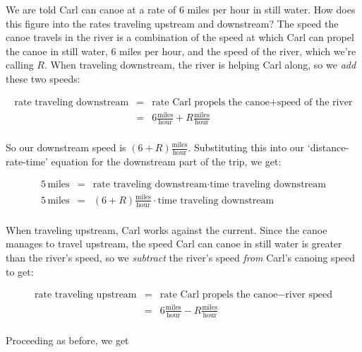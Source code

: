 \begin{ex}
We are told Carl can canoe at a  rate of $6$ miles per hour in still water.  How does this figure into the rates traveling upstream and downstream?  The speed the canoe travels in the river is a combination of the speed at which Carl can propel the canoe in still water, 6 miles per hour,  and the speed of the river, which we're calling $R$. When traveling downstream, the river is helping Carl along, so we \textit{add} these two speeds: 

\[ \begin{array}{rcl}

\text{rate traveling downstream} & = & \text{rate Carl propels the canoe} + \text{speed of the river} \\

 & = & 6 \frac{\text{miles}}{\text{hour}} + R \frac{\text{miles}}{\text{hour}} \\ \end{array} \]
 
 So our downstream speed is $(6+R) \frac{\text{miles}}{\text{hour}}$.  Substituting this into our `distance-rate-time' equation for the downstream part of the trip, we get:
 
 \[ \begin{array}{rcl}

5 \, \text{miles} & = & \text{rate traveling downstream} \cdot \text{time traveling downstream} \\ 

5 \, \text{miles} & = & (6+R) \frac{\text{miles}}{\text{hour}} \cdot \text{time traveling downstream} \\ 	\end{array} \]

 When traveling upstream, Carl works against the current.  Since the canoe manages to travel upstream,  the speed Carl can canoe in still water is greater than the river's speed, so we \textit{subtract} the river's speed \textit{from} Carl's canoing speed to get:
 
 \[ \begin{array}{rcl}

\text{rate traveling upstream} & = & \text{rate Carl propels the canoe} - \text{river speed} \\

 & = & 6 \frac{\text{miles}}{\text{hour}} - R \frac{\text{miles}}{\text{hour}} \\ \end{array} \]
 
Proceeding as before, we get
 

\end{ex}
